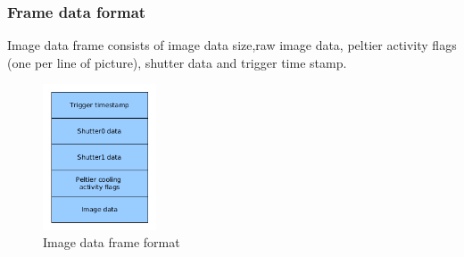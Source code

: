 \subsubsection{Frame data format}
Image data frame consists of image data size,raw image data, peltier activity flags (one per line of picture), shutter data and trigger time stamp.

%

\begin{figure}[H]
\centering
\includegraphics[width=0.3\textwidth]{pict_ipc/frame_format.png}
\caption{Image data frame format}
\label{fig:frame_format}
\end{figure}


